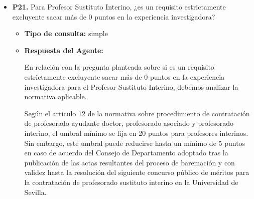 \documentclass{article}
\begin{document}
\begin{itemize}
\begin{itemize}
\begin{scriptsize}
                  \#\# Documentación acreditativa:

                  - El candidato debe incluir certificación oficial de la Universidad donde se expliciten los puestos ocupados (hoja de servicios oficial) y la docencia impartida oficialmente (certificado de actividades docentes).
                  - En los casos en que el certificado de actividades docentes no explicite el departamento y, en particular, el área de conocimiento de adscripción de las asignaturas impartidas, debe adjuntarse, o bien una hoja de servicios que permita validar a qué departamento y área pertenece el candidato en cada periodo docente, o cualquier otro documento que supla la necesidad descrita (por ejemplo, el programa de la asignatura publicado por la Universidad de Sevilla indica Departamento y Área de conocimiento responsable de la asignatura). El área de conocimiento desempeña un papel clave en la valoración del candidato y debe quedar debidamente acreditada su pertenencia.
                  - Si el candidato ha impartido la docencia de la asignatura en idioma distinto al oficial de su territorio de impartición, deberá incluir la acreditación del nivel del idioma (al menos B2 del Marco Común Europeo de Referencia para las Lenguas o equivalente) junto con un certificado del secretario del departamento responsable de la docencia (u órgano equivalente), de haber impartido la docencia en otro idioma (salvo que el certificado de actividades docentes indique el idioma en que se imparte la asignatura).

                  Revisión 4 (marzo, 2025) 27
                \end{scriptsize}
        \end{itemize}


  \item \textbf{P21.} Para Profesor Sustituto Interino, ¿es un requisito estrictamente excluyente sacar más de 0 puntos en la experiencia investigadora? \\
        \begin{itemize}
          \item \textbf{Tipo de consulta:} simple
          \item \textbf{Respuesta del Agente:}

                En relación con la pregunta planteada sobre si es un requisito estrictamente excluyente sacar más de 0 puntos en la experiencia investigadora para el Profesor Sustituto Interino, debemos analizar la normativa aplicable.

                Según el artículo 12 de la normativa sobre procedimiento de contratación de profesorado ayudante doctor, profesorado asociado y profesorado interino, el umbral mínimo se fija en 20 puntos para profesores interinos. Sin embargo, este umbral puede reducirse hasta un mínimo de 5 puntos en caso de acuerdo del Consejo de Departamento adoptado tras la publicación de las actas resultantes del proceso de baremación y con validez hasta la resolución del siguiente concurso público de méritos para la contratación de profesorado sustituto interino en la Universidad de Sevilla.


\end{itemize}
\end{itemize}
\end{document}
